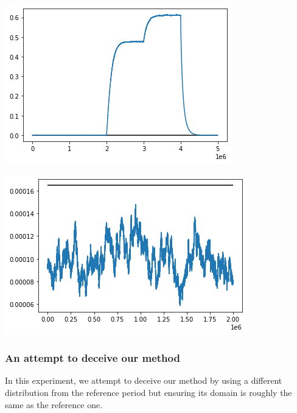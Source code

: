 \begin{center}
\begin{minipage}{.5\textwidth}
  \centering
  \includegraphics[width=1\linewidth]{figures/stream-analysis-viz-test04.png}
  \label{fig:JSD-signal-test04}
\end{minipage}%
\begin{minipage}{.5\textwidth}
  \centering
  \includegraphics[width=1\linewidth]{figures/stream-analysis-viz-zoom-test04.png}
  \label{fig:JSD-signal-zoom-test04}
\end{minipage}
\end{center}

\subsubsection{An attempt to deceive our method}
In this experiment, we attempt to deceive our method by using a different distribution from the reference period but ensuring its domain is roughly the same as the reference one.

